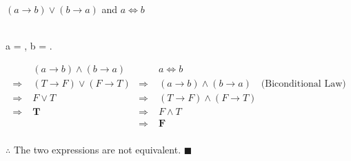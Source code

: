 \documentclass[]{article}
\begin{document}
\begin{question}
    $(a \rightarrow b) \lor (b \rightarrow a)$ and $a \iff b$
\end{question}
\begin{center}
         \\
         a = , b = . \\
\end{center}
\begin{align*}
    & (a \rightarrow b) \land (b \rightarrow a) & & a \iff b\\
    \Rightarrow\; & (T \rightarrow F) \lor (F \rightarrow T) & \Rightarrow\; & (a \rightarrow b) \land (b \rightarrow a) \quad \text{(Biconditional Law)}\\
    \Rightarrow\; & F \lor T & \Rightarrow\; &  (T \rightarrow F) \land (F \rightarrow T)\\
    \Rightarrow\; & \mathbf{T} & \Rightarrow\; & F \land T \\
    & &  \Rightarrow\; & \mathbf{F} \\
\end{align*}
\begin{center}
    $\therefore$ The two expressions are not equivalent. $\blacksquare$
\end{center}
\end{document}
